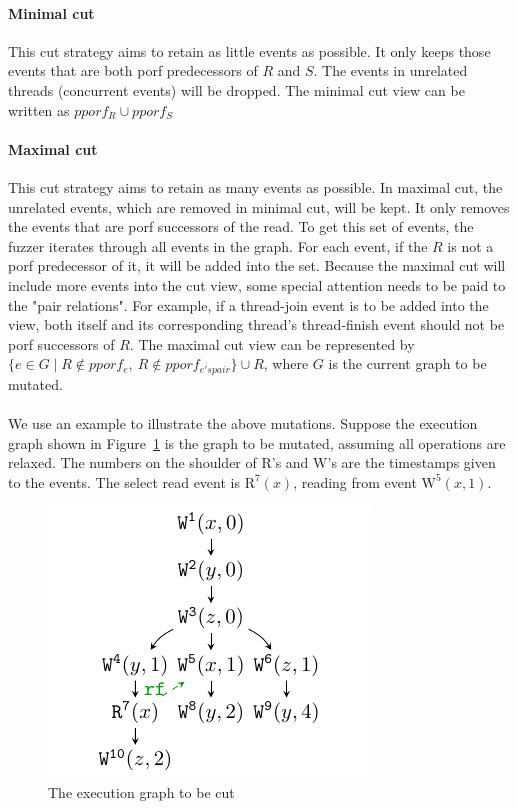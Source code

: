 \paragraph{Minimal cut} This cut strategy aims to retain as little events as possible. It only keeps those events that are both porf predecessors of $R$ and $S$. The events in unrelated threads (concurrent events) will be dropped. The minimal cut view can be written as $pporf_{R} \cup pporf_{S}$

\paragraph{Maximal cut} This cut strategy aims to retain as many events as possible. In maximal cut, the unrelated events, which are removed in minimal cut, will be kept. It only removes the events that are porf successors of the read. To get this set of events, the fuzzer iterates through all events in the graph. For each event, if the $R$ is not a porf predecessor of it, it will be added into the set. Because the maximal cut will include more events into the cut view, some special attention needs to be paid to the "pair relations". For example, if a thread-join event is to be added into the view, both itself and its corresponding thread's thread-finish event should not be porf successors of $R$. The maximal cut view can be represented by $\{e \in G \mid R \notin pporf_e, \  R \notin pporf_{e's pair}\} \cup {R}$, where $G$ is the current graph to be mutated. 



\paragraph{}We use an example to illustrate the above mutations. Suppose the execution graph shown in Figure~\ref{cut:to-be-cut} is the graph to be mutated, assuming all operations are relaxed. The numbers on the shoulder of $\text{R}$'s and $\text{W}$'s are the timestamps given to the events. The select read event is $\text{R}^7(x)$, reading from event $\text{W}^5(x, 1)$. 

\begin{figure}[htbp] 
	\centering
	\includegraphics[scale=1]{figure/cuts/cut.pdf} 
	\caption{The execution graph to be cut} 
	\label{cut:to-be-cut} 
\end{figure}


